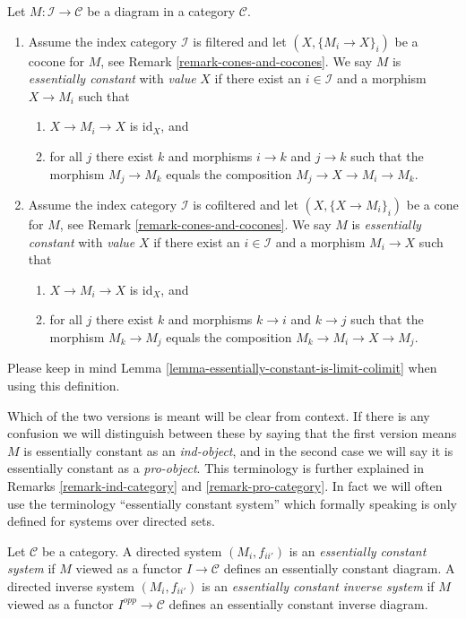 \begin{definition}
\label{definition-essentially-constant-diagram}
Let $M : \mathcal{I} \to \mathcal{C}$ be a diagram in a category
$\mathcal{C}$.
\begin{enumerate}
\item Assume the index category $\mathcal{I}$ is filtered and
let $(X, \{M_i \to X\}_i)$ be a cocone for $M$, see
Remark \ref{remark-cones-and-cocones}. We say $M$ is
{\it essentially constant} with {\it value} $X$ if there exist an
$i \in \mathcal{I}$ and a morphism $X \to M_i$ such that
\begin{enumerate}
\item $X \to M_i \to X$ is $\text{id}_X$, and
\item for all $j$ there exist $k$ and morphisms $i \to k$ and $j \to k$
such that the morphism $M_j \to M_k$ equals the composition
$M_j \to X \to M_i \to M_k$.
\end{enumerate}
\item Assume the index category $\mathcal{I}$ is cofiltered and let
$(X, \{X \to M_i\}_i)$ be a cone for $M$, see
Remark \ref{remark-cones-and-cocones}. We say
$M$ is {\it essentially constant} with {\it value} $X$ if
there exist an $i \in \mathcal{I}$
and a morphism $M_i \to X$ such that
\begin{enumerate}
\item $X \to M_i \to X$ is $\text{id}_X$, and
\item for all $j$ there exist $k$ and morphisms $k \to i$ and $k \to j$
such that the morphism $M_k \to M_j$ equals the composition
$M_k \to M_i \to X \to M_j$.
\end{enumerate}
\end{enumerate}
Please keep in mind Lemma \ref{lemma-essentially-constant-is-limit-colimit}
when using this definition.
\end{definition}

\noindent
Which of the two versions is meant will be clear from context. If there is
any confusion we will distinguish between these by saying that the first
version means $M$ is essentially constant as an {\it ind-object}, and in
the second case we will say it is essentially constant as a {\it pro-object}.
This terminology is further explained in
Remarks \ref{remark-ind-category} and \ref{remark-pro-category}.
In fact we will often use the terminology ``essentially constant system''
which formally speaking is only defined for systems over directed sets.

\begin{definition}
\label{definition-essentially-constant-system}
Let $\mathcal{C}$ be a category. A directed system
$(M_i, f_{ii'})$ is an {\it essentially constant system}
if $M$ viewed as a functor $I \to \mathcal{C}$
defines an essentially constant diagram. A directed inverse system
$(M_i, f_{ii'})$ is an {\it essentially constant inverse system} if
$M$ viewed as a functor $I^{opp} \to \mathcal{C}$ defines an
essentially constant inverse diagram.
\end{definition}

